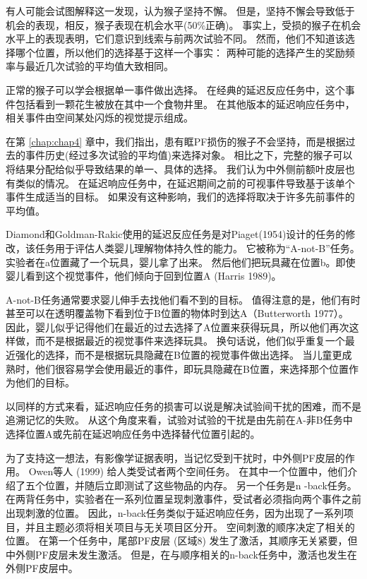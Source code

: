 有人可能会试图解释这一发现，认为猴子坚持不懈。
但是，坚持不懈会导致低于机会的表现，相反，猴子表现在机会水平(50\%正确)。
事实上，受损的猴子在机会水平上的表现表明，它们意识到线索与前两次试验不同。
然而，他们不知道该选择哪个位置，所以他们的选择基于这样一个事实：
两种可能的选择产生的奖励频率与最近几次试验的平均值大致相同。


正常的猴子可以学会根据单一事件做出选择。
在经典的延迟反应任务中，这个事件包括看到一颗花生被放在其中一个食物井里。
在其他版本的延迟响应任务中，相关事件由空间某处闪烁的视觉提示组成。


在第 \ref{chap:chap4} 章中，我们指出，患有眶PF损伤的猴子不会坚持，而是根据过去的事件历史(经过多次试验的平均值)来选择对象。
相比之下，完整的猴子可以将结果分配给似乎导致结果的单一、具体的选择。
我们认为中外侧前额叶皮层也有类似的情况。
在延迟响应任务中，在延迟期间之前的可视事件导致基于该单个事件生成适当的目标。
如果没有这种影响，我们的选择将取决于许多先前事件的平均值。


Diamond和Goldman-Rakic使用的延迟反应任务是对Piaget(1954)设计的任务的修改，该任务用于评估人类婴儿理解物体持久性的能力。
它被称为“A-not-B”任务。实验者在a位置藏了一个玩具，婴儿拿了出来。
然后他们把玩具藏在位置b。即使婴儿看到这个视觉事件，他们倾向于回到位置A (Harris 1989)。


A-not-B任务通常要求婴儿伸手去找他们看不到的目标。
值得注意的是，他们有时甚至可以在透明覆盖物下看到位于B位置的物体时到达A（Butterworth 1977）。
因此，婴儿似乎记得他们在最近的过去选择了A位置来获得玩具，所以他们再次这样做，而不是根据最近的视觉事件来选择玩具。
换句话说，他们似乎重复一个最近强化的选择，而不是根据玩具隐藏在B位置的视觉事件做出选择。
当儿童更成熟时，他们很容易学会使用最近的事件，即玩具隐藏在B位置，来选择那个位置作为他们的目标。


以同样的方式来看，延迟响应任务的损害可以说是解决试验间干扰的困难，而不是追溯记忆的失败。
从这个角度来看，试验对试验的干扰是由先前在A-非B任务中选择位置A或先前在延迟响应任务中选择替代位置引起的。


为了支持这一想法，有影像学证据表明，当记忆受到干扰时，中外侧PF皮层的作用。
Owen等人 (1999) 给人类受试者两个空间任务。
在其中一个位置中，他们介绍了五个位置，并随后立即测试了这些物品的内存。
另一个任务是n -back任务。
在两背任务中，实验者在一系列位置呈现刺激事件，受试者必须指向两个事件之前出现刺激的位置。
因此，n-back任务类似于延迟响应任务，因为出现了一系列项目，并且主题必须将相关项目与无关项目区分开。
空间刺激的顺序决定了相关的位置。
在第一个任务中，尾部PF皮层 (区域8) 发生了激活，其顺序无关紧要，但中外侧PF皮层未发生激活。
但是，在与顺序相关的n-back任务中，激活也发生在外侧PF皮层中。


